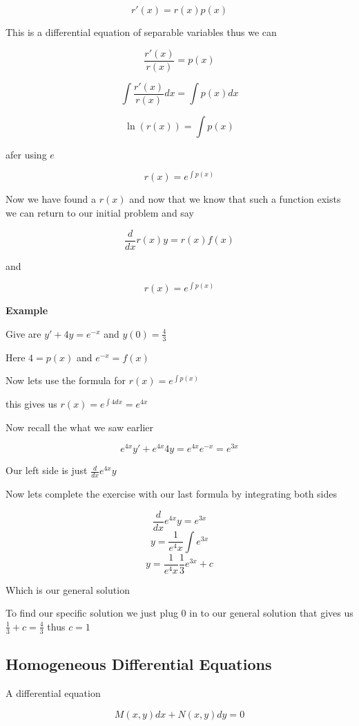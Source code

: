 \[r'(x) = r(x)p(x)\]

This is a differential equation of separable variables thus we can

\[\frac{r'(x)}{r(x)} = p(x)\]

\[\int \frac{r'(x)}{r(x)}dx = \int p(x)dx\]

\[ \ln(r(x)) = \int p(x)\]

afer using \(e\)

\[ r(x) = e^{\int p(x)}\]

Now we have found a \(r(x)\) and now that we know that such a function exists we can return 
to our initial problem and say

\[\frac{d}{dx}r(x)y = r(x)f(x)\]
\begin{center}
\end{center}

and 

\[r(x) = e^{\int p (x) }\]

\textbf{Example}

Give are \(y' + 4y = e^{-x}\) and \(y(0) = \frac{4}{3}\)

Here \(4 = p(x)\) and \(e^{-x} = f(x)\)

Now lets use the formula for \(r(x) = e^{\int p (x)}\)

this gives us \(r(x) = e^{\int 4dx} = e^{4x}\)

Now recall the what we saw earlier

\[e^{4x}y' + e^{4x}4y = e^{4x}e^{-x} = e^{3x}\]

Our left side is just \(\frac{d}{dx} e^{4x}y\)

Now lets complete the exercise with our last formula by integrating both sides

\[\frac{d}{dx} e^{4x}y = e^{3x}\]
\[y = \frac{1}{e^4x}\int e^{3x}\]
\[y = \frac{1}{e^4x} \frac{1}{3}e^{3x} + c\]

Which is our general solution

To find our specific solution we just plug 0 in to our general solution that gives us
\(\frac{1}{3} + c = \frac{4}{3}\) thus \(c = 1\)

\subsection{Homogeneous Differential Equations}

A differential equation 

\[M(x,y)dx + N(x,y)dy = 0\]

